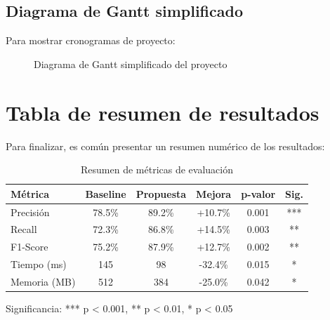 \subsection{Diagrama de Gantt simplificado}
\label{subsec:gantt-simplificado}

Para mostrar cronogramas de proyecto:

\begin{figure}[H]
  \centering
  \caption{Diagrama de Gantt simplificado del proyecto}
  \label{fig:gantt-simple}
\end{figure}

\section{Tabla de resumen de resultados}
\label{sec:tabla-resumen}

Para finalizar, es común presentar un resumen numérico de los resultados:

\begin{table}[H]
  \centering
  \caption{Resumen de métricas de evaluación}
  \label{tab:resumen-metricas}
  \begin{tabular}{@{}lccccc@{}}
    \toprule
    \textbf{Métrica} & \textbf{Baseline} & \textbf{Propuesta} & \textbf{Mejora} & \textbf{p-valor} & \textbf{Sig.} \\
    \midrule
    Precisión & 78.5\% & 89.2\% & +10.7\% & 0.001 & *** \\
    Recall & 72.3\% & 86.8\% & +14.5\% & 0.003 & ** \\
    F1-Score & 75.2\% & 87.9\% & +12.7\% & 0.002 & ** \\
    Tiempo (ms) & 145 & 98 & -32.4\% & 0.015 & * \\
    Memoria (MB) & 512 & 384 & -25.0\% & 0.042 & * \\
    \bottomrule
  \end{tabular}

  \medskip
  \footnotesize
  Significancia: *** p < 0.001, ** p < 0.01, * p < 0.05
\end{table}

